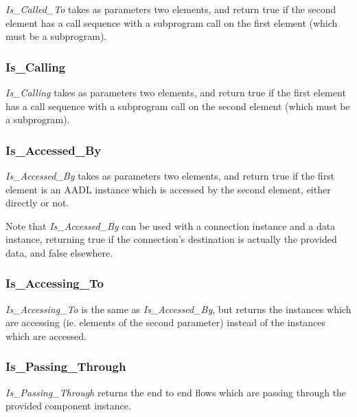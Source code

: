 \textit{Is\_Called\_To} takes as parameters two elements,
and return true if the second element has a call sequence
with a subprogram call on the first element (which must be
a subprogram).

\subsubsection {Is\_Calling}

\textit{Is\_Calling} takes as parameters two elements,
and return true if the first element has a call sequence
with a subprogram call on the second element (which must 
be a subprogram).

\subsubsection {Is\_Accessed\_By}

\textit{Is\_Accessed\_By} takes as parameters two elements,
and return true if the first element is an AADL instance which 
is accessed by the second element, either directly or not.

Note that \textit{Is\_Accessed\_By} can be used with a 
connection instance and a data instance, returning true if the
connection's destination is actually the provided data, and false 
elsewhere.

\subsubsection {Is\_Accessing\_To}

\textit{Is\_Accessing\_To} is the same as \textit{Is\_Accessed\_By}, 
but returns the instances which are accessing (ie. elements of
the second parameter) instead of the instances which are accessed.

\subsubsection {Is\_Passing\_Through}

\textit {Is\_Passing\_Through} returns the end to end flows which are passing
through the provided component instance.
